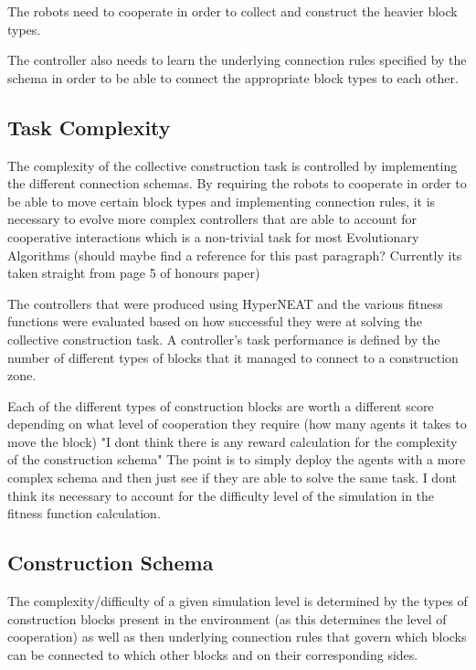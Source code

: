 The robots need to cooperate in order to collect and construct the heavier block types.

The controller also needs to learn the underlying connection rules specified by the schema in order to be able to connect the appropriate block types to each other.




\subsection{Task Complexity}

The complexity of the collective construction task is controlled by implementing the different connection schemas. By requiring the robots to cooperate in order to be able to move certain block types and implementing connection rules, it is necessary to evolve more complex controllers that are able to account for cooperative interactions which is a non-trivial task for most Evolutionary Algorithms (should maybe find a reference for this past paragraph? Currently its taken straight from page 5 of honours paper)

The controllers that were produced using HyperNEAT and the various fitness functions were evaluated based on how successful they were at solving the collective construction task. A controller's task performance is defined by the number of different types of blocks that it managed to connect to a construction zone.

Each of the different types of construction blocks are worth a different score depending on what level of cooperation they require (how many agents it takes to move the block)
"I dont think there is any reward calculation for the complexity of the construction schema" The point is to simply deploy the agents with a more complex schema and then just see if they are able to solve the same task. I dont think its necessary to account for the difficulty level of the simulation in the fitness function calculation.

\subsection{Construction Schema}

The complexity/difficulty of a given simulation level is determined by the types of construction blocks present in the environment (as this determines the level of cooperation) as well as then underlying connection rules that govern which blocks can be connected to which other blocks and on their corresponding sides.

